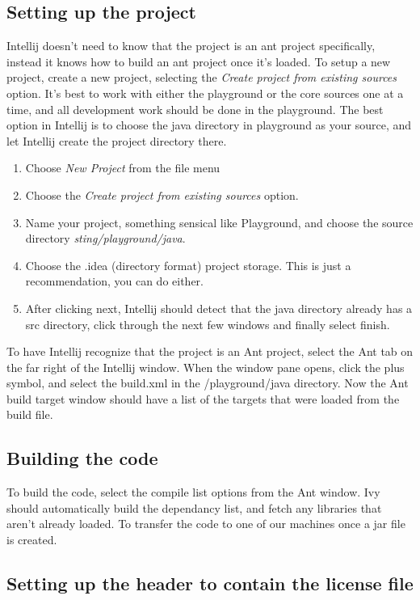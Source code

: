 \documentclass[11pt,fullpage]{article}
\begin{document}
\subsection{Setting up the project}
Intellij doesn't need to know that the project is an ant project specifically, instead it knows how to build an ant project once it's loaded.  To
setup a new project, create a new project, selecting the \textit{Create project from existing sources} option.  It's best to work with either the 
playground or the core sources one at a time, and all development work should be done in the playground.  The best option in Intellij is to 
choose the java directory in playground as your source, and let Intellij create the project directory there. 
\\
\begin{enumerate}
\item Choose \textit{New Project} from the file menu \\
\item Choose the \textit{Create project from existing sources} option.\\
\item Name your project, something sensical like Playground, and choose the source directory \textit{sting/playground/java}. \\
\item Choose the .idea (directory format) project storage.  This is just a recommendation, you can do either. \\
\item After clicking next, Intellij should detect that the java directory already has a src directory, click through the next few windows and finally select finish.
\end{enumerate}

To have Intellij recognize that the project is an Ant project, select the Ant tab on the far right of the Intellij window.  When the window pane opens, click the
plus symbol, and select the build.xml in the /playground/java directory.  Now the Ant build target window should have a list of the targets that were loaded
from the build file.

\subsection{Building the code}
To build the code, select the compile list options from the Ant window.  Ivy should automatically build the dependancy list, and fetch any libraries that aren't already loaded.  To 
transfer the code to one of our machines once a jar file is created.  

\subsection{Setting up the header to contain the license file}
\end{document}
